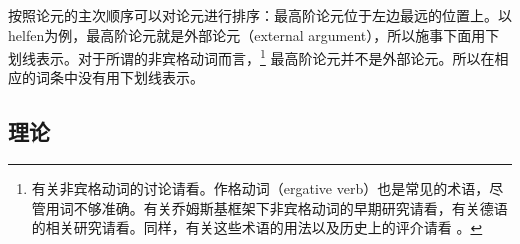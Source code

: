 按照论元的主次顺序可以对论元进行排序：最高阶论元位于左边最远的位置上。以helfen为例，最高阶论元就是外部论元（external argument），所以施事下面用下划线表示。对于所谓的非宾格动词而言，\footnote{
有关非宾格动词的讨论请看。作格动词（ergative verb）也是常见的术语，尽管用词不够准确。有关乔姆斯基框架下非宾格动词的早期研究请看，有关德语的相关研究请看。同样，有关这些术语的用法以及历史上的评介请看 。
}
最高阶论元并不是外部论元。所以在相应的词条中没有用下划线表示。

\subsection{\xbar 理论}
\label{Abschnitt-X-Bar}

